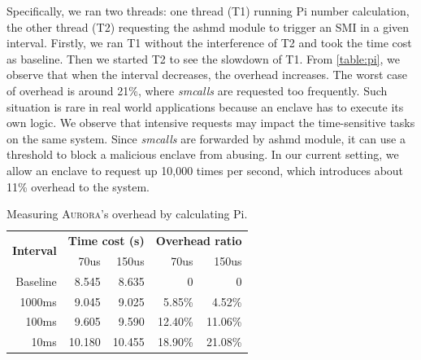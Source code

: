 Specifically, we ran two threads: one thread (T1) running Pi number calculation, the other thread (T2) requesting the ashmd module to trigger an SMI in a given interval. Firstly, we ran T1 without the interference of T2 and took the time cost as baseline. Then we started T2 to see the slowdown of T1. From \autoref{table:pi}, we observe that when the interval decreases, the overhead increases. The worst case of overhead is around 21\%, where \textit{smcalls} are requested too frequently. Such situation is rare in real world applications because an enclave has to execute its own logic. We observe that intensive requests may impact the time-sensitive tasks on the same system. Since \textit{smcalls} are forwarded by ashmd module, it can use a threshold to block a malicious enclave from abusing. In our current setting, we allow an enclave to request up 10,000 times per second, which introduces about 11\% overhead to the system.

\begin{table}[t]
	\centering
	\caption{Measuring \textsc{Aurora}'s overhead by calculating Pi.}
	\label{table:pi}
	\begin{tabular}{rrrrr}
		\toprule
		\multirow{2}{*}{\textbf{Interval}} & \multicolumn{2}{c}{\textbf{Time cost (s)}} & \multicolumn{2}{c}{\textbf{Overhead ratio}} \\\cmidrule{2-3}	 \cmidrule{4-5}
		& 70us & 150us & 70us & 150us \\
		\midrule
		Baseline & 8.545 & 8.635 & 0 & 0\\
		1000ms & 9.045 & 9.025 & 5.85\% & 4.52\%\\
		100ms & 9.605 & 9.590 & 12.40\% & 11.06\%\\
		10ms & 10.180 & 10.455 & 18.90\% & 21.08\%\\
		\bottomrule
	\end{tabular}
\end{table}

